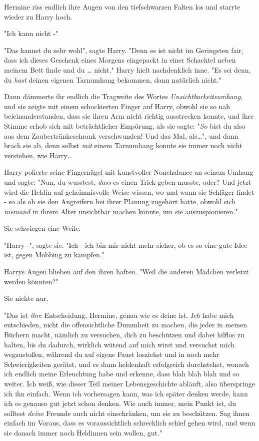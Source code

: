 {Hermine riss endlich ihre Augen von den tiefschwarzen Falten los und starrte wieder zu Harry hoch.

"Ich kann nicht -"

"Das kannst du sehr wohl", sagte Harry. "Denn es ist nicht im Geringsten fair, dass ich dieses Geschenk eines Morgens eingepackt in einer Schachtel neben meinem Bett finde und du … nicht." Harry hielt nachdenklich inne. "Es sei denn, du \emph{hast} deinen eigenen Tarnumhang bekommen, dann natürlich nicht."

Dann dämmerte ihr endlich die Tragweite des Wortes \emph{Unsichtbarkeitsumhang}, und sie zeigte mit einem schockierten Finger auf Harry, obwohl sie so nah beieinanderstanden, dass sie ihren Arm nicht richtig ausstrecken konnte, und ihre Stimme erhob sich mit beträchtlicher Empörung, als sie sagte: "\emph{So} bist du also aus dem Zaubertränkeschrank verschwunden! Und das Mal, als…", und dann brach sie ab, denn selbst \emph{mit} einem Tarnumhang konnte sie immer noch nicht verstehen, wie Harry…

Harry polierte seine Fingernägel mit kunstvoller Nonchalance an seinem Umhang und sagte: "Nun, du wusstest, \emph{dass} es einen Trick geben musste, oder? Und jetzt wird die Heldin auf geheimnisvolle Weise wissen, wo und wann sie Schläger findet - so als ob sie den Angreifern bei ihrer Planung zugehört hätte, obwohl sich \emph{niemand} in ihrem Alter unsichtbar machen könnte, um sie auszuspionieren."

Sie schwiegen eine Weile.

"Harry -", sagte sie. "Ich - ich bin mir nicht mehr sicher, ob es so eine gute Idee ist, gegen Mobbing zu kämpfen."

Harrys Augen blieben auf den ihren haften. "Weil die anderen Mädchen verletzt werden könnten?"

Sie nickte nur.

"Das ist \emph{ihre} Entscheidung, Hermine, genau wie es deine ist. \emph{Ich} habe mich entschieden, nicht die offensichtliche Dummheit zu machen, die jeder in meinen Büchern macht, nämlich zu versuchen, dich zu beschützen und dabei hilflos zu halten, bis du dadurch, wirklich wütend auf mich wirst und versuchst mich wegzustoßen, während du auf eigene Faust losziehst und in noch mehr Schwierigkeiten gerätst, und es dann heldenhaft erfolgreich durchstehst, wonach ich endlich meine Erleuchtung habe und erkenne, dass blah blah blah und so weiter. Ich weiß, wie dieser Teil meiner Lebensgeschichte abläuft, also überspringe ich ihn einfach. Wenn ich vorhersagen kann, was ich später denken werde, kann ich es genauso gut jetzt schon denken. Wie auch immer, mein Punkt ist, du solltest \emph{deine} Freunde auch nicht einschränken, um sie zu beschützen. Sag ihnen einfach im Voraus, dass es voraussichtlich schrecklich schief gehen wird, und wenn sie danach immer noch Heldinnen sein wollen, gut."

}
